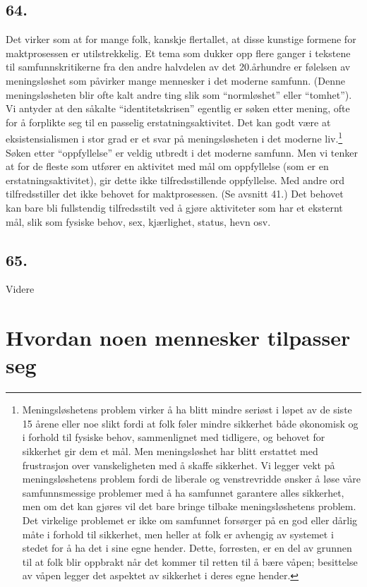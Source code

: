 \documentclass[oneside]{book}
\begin{document}
\section*{64.}
Det virker som at for mange folk, kanskje flertallet, at disse kunstige formene
for maktprosessen er utilstrekkelig. Et tema som dukker opp flere ganger i
tekstene til samfunnskritikerne fra den andre halvdelen av det 20.århundre er
følelsen av meningsløshet som påvirker mange mennesker i det moderne samfunn.
(Denne meningsløsheten blir ofte kalt andre ting slik som ``normløshet'' eller
``tomhet''). Vi antyder at den såkalte ``identitetskrisen'' egentlig er søken
etter mening, ofte for å forplikte seg til en passelig erstatningsaktivitet. Det
kan godt være at eksistensialismen i stor grad er et svar på meningsløsheten i
det moderne liv.\footnote{Meningsløshetens problem virker å ha blitt mindre
seriøst i løpet av de siste 15 årene eller noe slikt fordi at folk føler mindre
sikkerhet både økonomisk og i forhold til fysiske behov, sammenlignet med
tidligere, og behovet for sikkerhet gir dem et mål. Men meningsløshet har blitt
erstattet med frustrasjon over vanskeligheten med å skaffe sikkerhet. Vi legger
vekt på meningsløshetens problem fordi de liberale og venstrevridde ønsker å
løse våre samfunnsmessige problemer med å ha samfunnet garantere alles
sikkerhet, men om det kan gjøres vil det bare bringe tilbake meningsløshetens
problem. Det virkelige problemet er ikke om samfunnet forsørger på en god eller
dårlig måte i forhold til sikkerhet, men heller at folk er avhengig av systemet
i stedet for å ha det i sine egne hender. Dette, forresten, er en del av grunnen
til at folk blir oppbrakt når det kommer til retten til å bære våpen; besittelse
av våpen legger det aspektet av sikkerhet i deres egne hender.} Søken etter
``oppfyllelse'' er veldig utbredt i det moderne samfunn. Men vi tenker at for de
fleste som utfører en aktivitet med mål om oppfyllelse (som er en
erstatningsaktivitet), gir dette ikke tilfredsstillende oppfyllelse. Med andre
ord tilfredsstiller det ikke behovet for maktprosessen. (Se avsnitt 41.) Det
behovet kan bare bli fullstendig tilfredsstilt ved å gjøre aktiviteter som har
et eksternt mål, slik som fysiske behov, sex, kjærlighet, status, hevn osv.

\section*{65.}
Videre

\chapter{Hvordan noen mennesker tilpasser seg}
\end{document}
